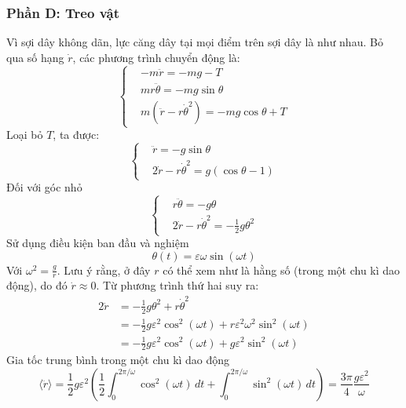 \subsubsection*{Phần D: Treo vật}
\noindent Vì sợi dây không dãn, lực căng dây tại mọi điểm trên sợi dây là như nhau. Bỏ qua số hạng $\dot{r}$, các phương trình chuyển động là:
\begin{equation*}
  \left\{
  \begin{aligned}
     & - m \ddot{r}                    = - m g - T             \\
     & m r \ddot{\theta}               = - m g \sin \theta     \\
     & m(\ddot{r} - r \dot{\theta}^2)  = - m g \cos \theta + T
  \end{aligned}
  \right.
\end{equation*}
Loại bỏ $T$, ta được:
\begin{equation*}
  \left\{
  \begin{aligned}
     & \ddot{r}                      = - g \sin \theta     \\
     & 2 \dot{r} - r \dot{\theta}^2  = g (\cos \theta - 1)
  \end{aligned}
  \right.
\end{equation*}
Đối với góc nhỏ
\begin{equation*}
  \left\{
  \begin{aligned}
     & r \ddot{\theta}               = - g \theta               \\
     & 2 \dot{r} - r \dot{\theta}^2  = - \frac{1}{2} g \theta^2
  \end{aligned}
  \right.
\end{equation*}
Sử dụng điều kiện ban đầu và nghiệm
\begin{equation*}
  \theta(t) = \varepsilon \omega \sin(\omega t)
\end{equation*}
Với $\omega^2 = \frac{g}{r}$. Lưu ý rằng, ở đây $r$ có thể xem như là hằng số (trong một chu kì dao động), do đó $\dot{r} \approx 0$. Từ phương trình thứ hai suy ra:
\begin{align*}
  2 \ddot{r} & = - \frac{1}{2} g \theta^2 + r \dot{\theta}^2                                              \\
             & = - \frac{1}{2} g \varepsilon^2 \cos^2(\omega t) + r\varepsilon^2\omega^2 \sin^2(\omega t) \\
             & = - \frac{1}{2} g \varepsilon^2 \cos^2(\omega t) + g \varepsilon^2 \sin^2(\omega t)
\end{align*}
Gia tốc trung bình trong một chu kì dao động
\begin{equation*}
  \langle \ddot{r} \rangle = \frac{1}{2} g \varepsilon^2 \left( \frac{1}{2} \int_0^{2\pi/\omega} \cos^2(\omega t) \, dt + \int_0^{2\pi/\omega} \sin^2(\omega t) \, dt \right)
  = \frac{3 \pi}{4}  \frac{g \varepsilon^2}{\omega}
\end{equation*}